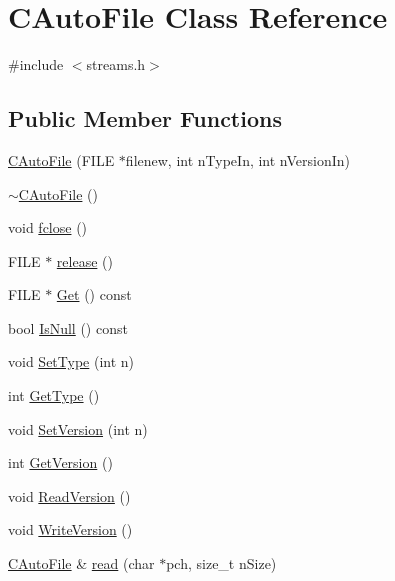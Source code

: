 \hypertarget{class_c_auto_file}{}\section{C\+Auto\+File Class Reference}
\label{class_c_auto_file}


{\ttfamily \#include $<$streams.\+h$>$}

\subsection*{Public Member Functions}
\begin{DoxyCompactItemize}
\item 
\hyperlink{class_c_auto_file_a52613083aaeab4c9238c649ae471783f}{C\+Auto\+File} (F\+I\+L\+E $\ast$filenew, int n\+Type\+In, int n\+Version\+In)
\item 
\hyperlink{class_c_auto_file_ab1362f4cb52c819c25cff4598e0f28da}{$\sim$\+C\+Auto\+File} ()
\item 
void \hyperlink{class_c_auto_file_abcbafe943bfe392c09363078fa8a4e77}{fclose} ()
\item 
F\+I\+L\+E $\ast$ \hyperlink{class_c_auto_file_a25b51d94dc85c4140da0b15494ac9f8a}{release} ()
\item 
F\+I\+L\+E $\ast$ \hyperlink{class_c_auto_file_aea31c0348f31ea40f592e2b7af6c2045}{Get} () const 
\item 
bool \hyperlink{class_c_auto_file_a78d666b1ef5dff5fd3f4ee33692b6d1d}{Is\+Null} () const 
\item 
void \hyperlink{class_c_auto_file_ac1a3986f191fe81384f58fc5fa073820}{Set\+Type} (int n)
\item 
int \hyperlink{class_c_auto_file_a774f2aad2c462d4ff47125ceec2ebab0}{Get\+Type} ()
\item 
void \hyperlink{class_c_auto_file_a51f805bc470a95c9948250503b587aec}{Set\+Version} (int n)
\item 
int \hyperlink{class_c_auto_file_a976ab8e5477aedd3a531fc49b01153ce}{Get\+Version} ()
\item 
void \hyperlink{class_c_auto_file_a9511060b5c971cff532faeab60c7d88b}{Read\+Version} ()
\item 
void \hyperlink{class_c_auto_file_a23d6f22c3aff80be7665bfc5a77a01ff}{Write\+Version} ()
\item 
\hyperlink{class_c_auto_file}{C\+Auto\+File} \& \hyperlink{class_c_auto_file_a87e670f3dd03055264c05b25335babb4}{read} (char $\ast$pch, size\+\_\+t n\+Size)
\item 

\end{DoxyCompactItemize}
